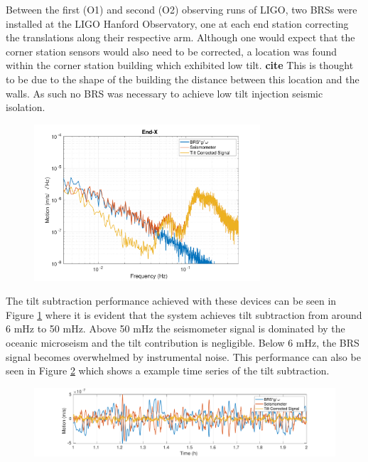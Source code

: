 \documentclass [12pt, proquest]{uwthesis}[2019]
\begin{document}
\quad Between the first (O1) and second (O2) observing runs of LIGO, two BRSs were installed at the LIGO Hanford Observatory, one at each end station correcting the translations along their respective arm. Although one would expect that the corner station sensors would also need to be corrected, a location was found within the corner station building which exhibited low tilt. \textbf{cite} This is thought to be due to the shape of the building the distance between this location and the walls. As such no BRS was necessary to achieve low tilt injection seismic isolation.

\begin{figure}%
\begin{center}
\includegraphics[width=0.75\textwidth]{HSubtractionETMX.pdf}
\caption{}
\label{sub}
\end{center}
\end{figure}

The tilt subtraction performance achieved with these devices can be seen in Figure \ref{sub} where it is evident that the system achieves tilt subtraction from around 6 mHz to 50 mHz. Above 50 mHz the seismometer signal is dominated by the oceanic microseism and the tilt contribution is negligible. Below 6 mHz, the BRS signal becomes overwhelmed by instrumental noise. This performance can also be seen in Figure \ref{subTime} which shows a example time series of the tilt subtraction. 

\begin{figure}%
\begin{center}
\includegraphics[width=\textwidth]{TiltCorrTime.pdf}
\caption{}
\label{subTime}
\end{center}
\end{figure}
\end{document}
